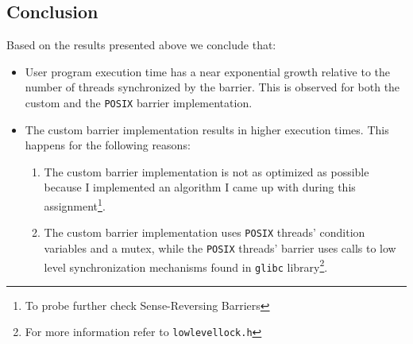 \documentclass{article}
\def\code#1{\texttt{#1}}
\begin{document}


\subsection{Conclusion}
Based on the results presented above we conclude that:

\begin{itemize}
 \item User program execution time has a near exponential growth relative to the number of
       threads synchronized by the barrier. This is observed for both the custom and the
       \texttt{POSIX} barrier implementation.
 \item The custom barrier implementation results in higher execution times. This happens
       for the following reasons:
       \begin{enumerate}
         \item The custom barrier implementation is not as optimized as possible because I
         implemented an algorithm I came up with during this assignment\footnote{To probe further
         check Sense-Reversing Barriers}.
         \item The custom barrier implementation uses \texttt{POSIX} threads' condition variables
         and a mutex, while the \texttt{POSIX} threads' barrier uses calls to low level synchronization
         mechanisms found in \code{glibc} library\footnote{For more information refer to \code{lowlevellock.h}}.
       \end{enumerate}
\end{itemize}
\end{document}
